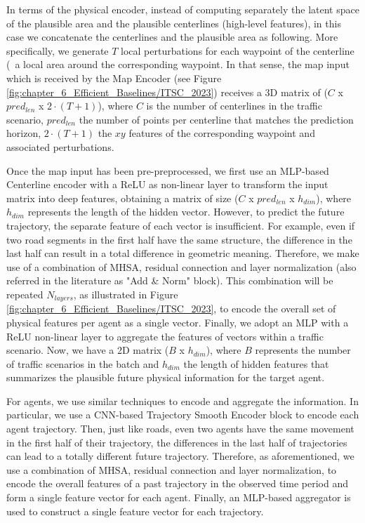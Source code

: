 In terms of the physical encoder, instead of computing separately the latent space of the plausible area and the plausible centerlines (high-level features), in this case we concatenate the centerlines and the plausible area as following. More specifically, we generate $T$ local perturbations for each waypoint of the centerline (\ie \ a local area around the corresponding waypoint. In that sense, the map input which is received by the Map Encoder (see Figure \ref{fig:chapter_6_Efficient_Baselines/ITSC_2023}) receives a 3D matrix of ($C$ x $pred_{len}$ x $2 \cdot (T+1)$), where $C$ is the number of centerlines in the traffic scenario, $pred_{len}$ the number of points per centerline that matches the prediction horizon, $2 \cdot (T+1)$ the $xy$ features of the corresponding waypoint and associated perturbations. 

Once the map input has been pre-preprocessed, we first use an \ac{MLP}-based Centerline encoder with a \ac{ReLU} as non-linear layer to transform the input matrix into deep features, obtaining a matrix of size ($C$ x $pred_{len}$ x $h_{dim}$), where $h_{dim}$ represents the length of the hidden vector. However, to predict the future trajectory, the separate feature of each vector is insufficient. For example, even if two road segments in the first half have the same structure, the difference in the last half can result in a total difference in geometric meaning. Therefore, we make use of a combination of \ac{MHSA}, residual connection and layer normalization (also referred in the literature as "Add \& Norm" block). This combination will be repeated $N_{layers}$, as illustrated in Figure \ref{fig:chapter_6_Efficient_Baselines/ITSC_2023}, to encode the overall set of physical features per agent as a single vector. Finally, we adopt an \ac{MLP} with a \ac{ReLU} non-linear layer to aggregate the features of vectors within a traffic scenario. Now, we have a 2D matrix ($B$ x $h_{dim}$), where $B$ represents the number of traffic scenarios in the batch and $h_{dim}$ the length of hidden features that summarizes the plausible future physical information for the target agent.

For agents, we use similar techniques to encode and aggregate the information. In particular, we use a \ac{CNN}-based Trajectory Smooth Encoder block to encode each agent trajectory. Then, just like roads, even two agents have the same movement in the first half of their trajectory, the differences in the last half of trajectories can lead to a totally different future trajectory. Therefore, as aforementioned, we use a combination of \ac{MHSA}, residual connection and layer normalization, to encode the overall features of a past trajectory in the observed time period and form a single feature vector for each agent. Finally, an \ac{MLP}-based aggregator is used to construct a single feature vector for each trajectory.

